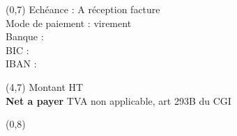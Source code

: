 \begin{textblock}{3}(0,7)
Echéance : A réception facture\\
Mode de paiement : virement\\
Banque : \aebanque{}\\
BIC : \aebic{}\\
IBAN : \aeiban{}
\end{textblock}

\begin{textblock}{2}(4,7)
Montant HT\hspace*{0.3cm} \hfill \facturetotal{}\\
\textbf{Net a payer}\hspace*{0.3cm}\hfill\textbf{\facturetotal{}}
\vskip 0.2cm
{\footnotesize TVA non applicable, art 293B du CGI}
\end{textblock}

\begin{textblock}{6}(0,8)
{\footnotesize  \aelegal{}}
\end{textblock}